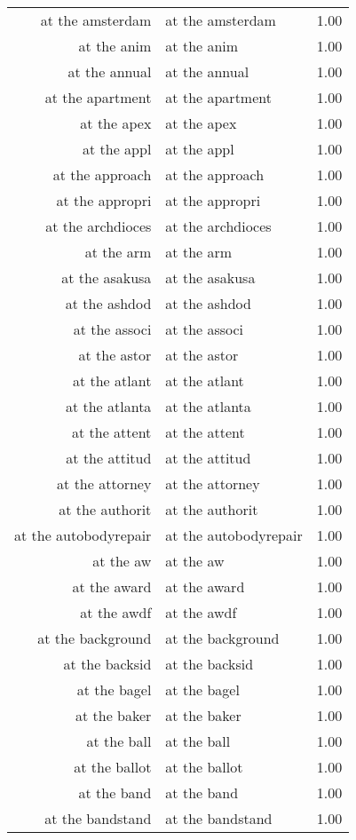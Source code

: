 \begin{table}[ht]
\begin{tabular}{rlr}
  at the amsterdam & at the amsterdam & 1.00 \\ 
  at the anim & at the anim & 1.00 \\ 
  at the annual & at the annual & 1.00 \\ 
  at the apartment & at the apartment & 1.00 \\ 
  at the apex & at the apex & 1.00 \\ 
  at the appl & at the appl & 1.00 \\ 
  at the approach & at the approach & 1.00 \\ 
  at the appropri & at the appropri & 1.00 \\ 
  at the archdioces & at the archdioces & 1.00 \\ 
  at the arm & at the arm & 1.00 \\ 
  at the asakusa & at the asakusa & 1.00 \\ 
  at the ashdod & at the ashdod & 1.00 \\ 
  at the associ & at the associ & 1.00 \\ 
  at the astor & at the astor & 1.00 \\ 
  at the atlant & at the atlant & 1.00 \\ 
  at the atlanta & at the atlanta & 1.00 \\ 
  at the attent & at the attent & 1.00 \\ 
  at the attitud & at the attitud & 1.00 \\ 
  at the attorney & at the attorney & 1.00 \\ 
  at the authorit & at the authorit & 1.00 \\ 
  at the autobodyrepair & at the autobodyrepair & 1.00 \\ 
  at the aw & at the aw & 1.00 \\ 
  at the award & at the award & 1.00 \\ 
  at the awdf & at the awdf & 1.00 \\ 
  at the background & at the background & 1.00 \\ 
  at the backsid & at the backsid & 1.00 \\ 
  at the bagel & at the bagel & 1.00 \\ 
  at the baker & at the baker & 1.00 \\ 
  at the ball & at the ball & 1.00 \\ 
  at the ballot & at the ballot & 1.00 \\ 
  at the band & at the band & 1.00 \\ 
  at the bandstand & at the bandstand & 1.00 \\ 

\end{tabular}
\end{table}
